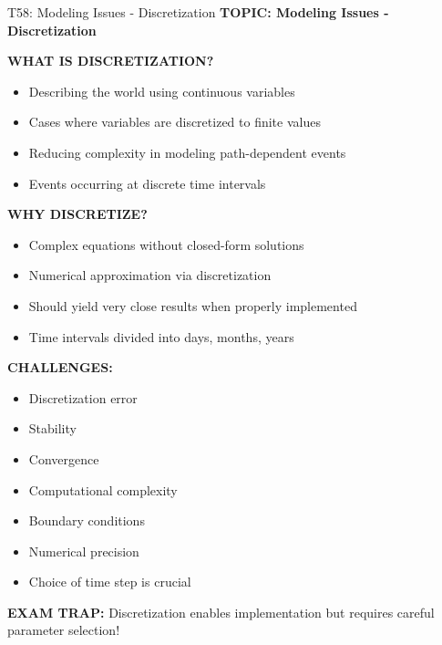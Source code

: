 \documentclass[8pt]{beamer}
\begin{document}
	\begin{frame}{T58: Modeling Issues - Discretization}
		\fontsize{6.5}{7.5}\selectfont
		\textbf{TOPIC: Modeling Issues - Discretization}
		
		\vspace{0.1cm}
		\textbf{WHAT IS DISCRETIZATION?}
		\begin{itemize}
			\item Describing the world using continuous variables
			\item Cases where variables are discretized to finite values
			\item Reducing complexity in modeling path-dependent events
			\item Events occurring at discrete time intervals
		\end{itemize}
		
		\vspace{0.1cm}
		\textbf{WHY DISCRETIZE?}
		\begin{itemize}
			\item Complex equations without closed-form solutions
			\item Numerical approximation via discretization
			\item Should yield very close results when properly implemented
			\item Time intervals divided into days, months, years
		\end{itemize}
		
		\vspace{0.1cm}
		\textbf{CHALLENGES:}
		\begin{itemize}
			\item Discretization error
			\item Stability
			\item Convergence
			\item Computational complexity
			\item Boundary conditions
			\item Numerical precision
			\item Choice of time step is crucial
		\end{itemize}
		
		\textcolor{myred}{\textbf{EXAM TRAP:}} Discretization enables implementation but \textcolor{myblue}{requires careful parameter selection}!
	\end{frame}
	
\end{document}
